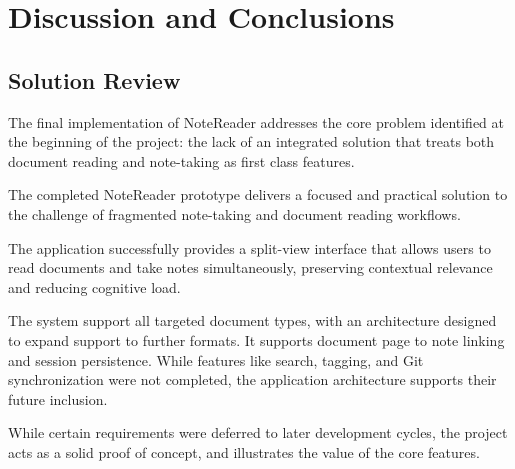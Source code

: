 \chapter{Discussion and Conclusions}
\label{chap:conclusions}


\section{Solution Review}
The final implementation of NoteReader addresses the core problem identified at the beginning of the project: the lack of an integrated solution that treats both document reading and note-taking as first class features.

The completed NoteReader prototype delivers a focused and practical solution to the challenge of fragmented note-taking and document reading workflows.  

The application successfully provides a split-view interface that allows users to read documents and take notes simultaneously, preserving contextual relevance and reducing cognitive load.

The system support all targeted document types, with an architecture designed to expand support to further formats. It supports document page to note linking and session persistence. While features like search, tagging, and Git synchronization were not completed, the application architecture supports their future inclusion.

While certain requirements were deferred to later development cycles, the project acts as a solid proof of concept, and illustrates the value of the core features. 


